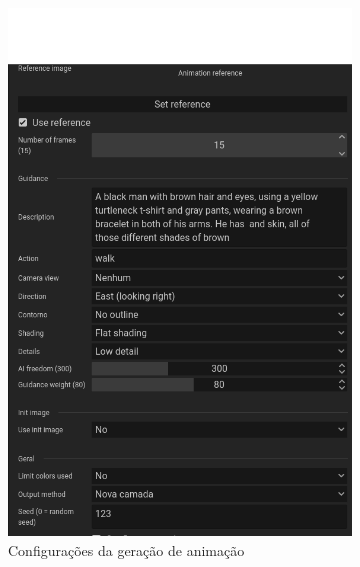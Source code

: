 \begin{figure}[htbp]
    \centering
    \caption{\small Processo da utilização 5 da ferramenta de animação do PixelLab em julho/2025}
    \label{fig:pixelLabAnimacao5}

    \begin{subfigure}{0.6\linewidth}
        \includegraphics[width=1\linewidth]{figs/pixelLab/dia3/tela_6.PNG}
        \caption{\small Configurações da geração de animação}
        \label{fig:pixelLabAnimacao5a}
    \end{subfigure}
    \begin{subfigure}{0.35\linewidth}

\end{subfigure}
\end{figure}
